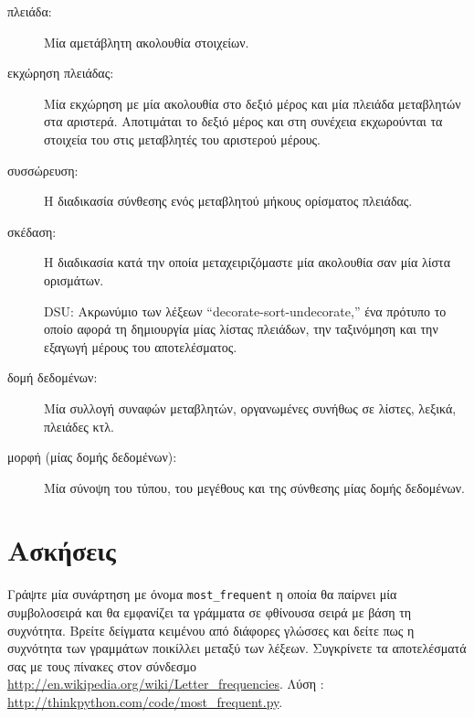 \documentclass[10pt]{book}
\begin{document}
\begin{description}

\item[πλειάδα:] Μία αμετάβλητη ακολουθία στοιχείων.

\item[εκχώρηση πλειάδας:] Μία εκχώρηση με μία ακολουθία στο δεξιό μέρος και μία πλειάδα μεταβλητών 
στα αριστερά. Αποτιμάται το δεξιό μέρος και στη συνέχεια εκχωρούνται τα στοιχεία του στις μεταβλητές του αριστερού μέρους.

\item[συσσώρευση:] Η διαδικασία σύνθεσης ενός μεταβλητού μήκους ορίσματος πλειάδας.

\item[σκέδαση:] Η διαδικασία κατά την οποία μεταχειριζόμαστε μία ακολουθία σαν μία λίστα ορισμάτων.

\item[] DSU:  Ακρωνύμιο των λέξεων  ``decorate-sort-undecorate,''  ένα πρότυπο το οποίο αφορά τη δημιουργία μίας λίστας πλειάδων, την ταξινόμηση και την εξαγωγή μέρους του αποτελέσματος.

\item[δομή δεδομένων:] Μία συλλογή συναφών μεταβλητών, οργανωμένες συνήθως σε λίστες, λεξικά, πλειάδες κτλ.

\item[μορφή (μίας δομής δεδομένων):] Μία σύνοψη του τύπου, του μεγέθους και της σύνθεσης μίας δομής δεδομένων.

\end{description}


\section{Ασκήσεις}

\begin{exercise}

Γράψτε μία συνάρτηση με όνομα  \verb"most_frequent"  η οποία θα παίρνει μία συμβολοσειρά και θα εμφανίζει τα γράμματα 
σε φθίνουσα σειρά με βάση τη συχνότητα. Βρείτε δείγματα κειμένου από διάφορες γλώσσες και δείτε πως η συχνότητα  των γραμμάτων ποικίλλει μεταξύ των λέξεων. Συγκρίνετε τα αποτελέσματά σας με τους πίνακες στον σύνδεσμο  \url{http://en.wikipedia.org/wiki/Letter_frequencies}.  Λύση : \url{http://thinkpython.com/code/most_frequent.py}.

\end{exercise}
 
\end{document}
